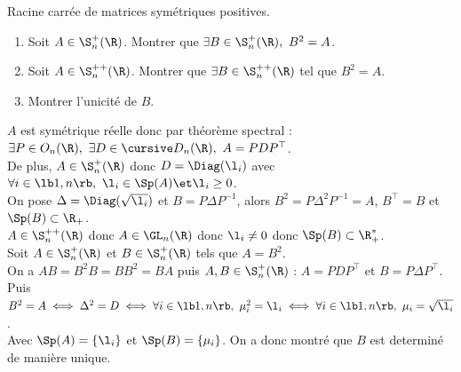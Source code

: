 \documentclass[11pt]{article}
\begin{document}
\begin{exercice}{Racine carrée de matrices symétriques positives.}{}
    \begin{enumerate}
        \item Soit $A\in\S_n^+(\R)$. Montrer que $\exists B \in \S_n^+(\R), ~ B^2=A$.
        \item Soit $A\in\S_n^{++}(\R)$. Montrer que $\exists B \in \S_n^{++}(\R)$ tel que $B^2=A$.
        \item Montrer l'unicité de $B$.
    \end{enumerate}
    \tcblower
     $A$ est symétrique réelle donc par théorème spectral : $\exists P \in O_n(\R), ~ \exists D \in \D_n(\R), ~ A=PDP^\top$.\\
    De plus, $A\in\S_n^+(\R)$ donc $D=\Diag(\l_i)$ avec $\forall i \in \lb1,n\rb,~\l_i \in \Sp(A) \et \l_i\geq0$.\\
    On pose $\Delta = \Diag(\sqrt{\l_i})$ et $B=P\Delta P^{-1}$, alors $B^2=P\Delta^2 P^{-1}=A$, $B^\top = B$ et $\Sp(B)\subset\R_+$.\\
     $A\in\S_{n}^{++}(\R)$ donc $A\in\GL_n(\R)$ donc $\l_i\neq0$ donc $\Sp(B)\subset\R_+^*$.\\
     Soit $A\in\S_n^+(\R)$ et $B\in\S_n^+(\R)$ tels que $A=B^2$.\\
    On a $AB=B^2B=BB^2=BA$ puis $A,B\in\S_n^+(\R)$ : $A=PDP^\top$ et $B=P\Delta P^\top$.\\
    Puis $B^2=A \iff \Delta^2= D \iff \forall i \in \lb1,n\rb, ~ \mu_i^2=\l_i \iff \forall i \in \lb1,n\rb, ~ \mu_i = \sqrt{\l_i}$.\\
    Avec $\Sp(A)=\{\l_i\}$ et $\Sp(B)=\{\mu_i\}$. On a donc montré que $B$ est determiné de manière unique.
\end{exercice}

\vspace*{-0.8cm}
\end{document}

